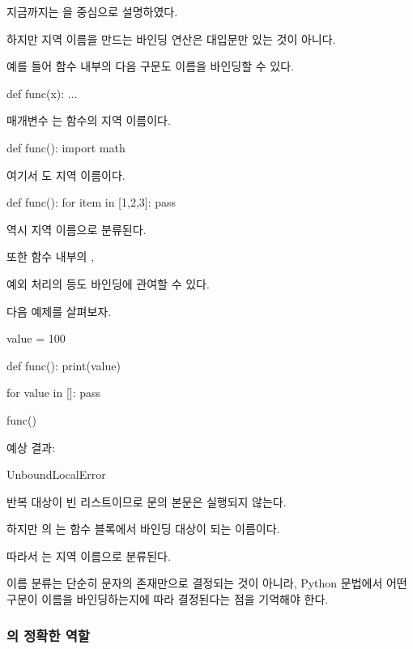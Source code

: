 지금까지는 을 중심으로 설명하였다.

하지만 지역 이름을 만드는 바인딩 연산은 대입문만 있는 것이 아니다.

예를 들어 함수 내부의 다음 구문도 이름을 바인딩할 수 있다.

\begin{dhkcode}
def func(x):
    ...
\end{dhkcode}

매개변수 는 함수의 지역 이름이다.

\begin{dhkcode}
def func():
    import math
\end{dhkcode}

여기서 도 지역 이름이다.

\begin{dhkcode}
def func():
    for item in [1,2,3]:
        pass
\end{dhkcode}

 역시 지역 이름으로 분류된다.

또한 함수 내부의 , 

예외 처리의  등도 바인딩에 관여할 수 있다.

다음 예제를 살펴보자.

\begin{dhkcode}
value = 100

def func():
    print(value)

    for value in []:
        pass

func()
\end{dhkcode}

예상 결과:

\begin{dhkzsh}
UnboundLocalError
\end{dhkzsh}

반복 대상이 빈 리스트이므로 문의 본문은 실행되지 않는다.

하지만 의 는 함수 블록에서 바인딩 대상이 되는 이름이다.

따라서 는 지역 이름으로 분류된다.

이름 분류는 단순히 \zsh{=} 문자의 존재만으로 결정되는 것이 아니라, Python 문법에서 어떤 구문이 이름을 바인딩하는지에 따라 결정된다는 점을 기억해야 한다.

\subsubsection{의 정확한 역할}

